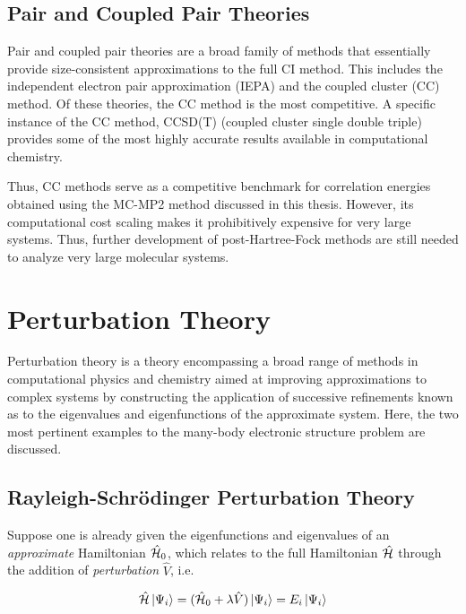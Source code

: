 \subsection{Pair and Coupled Pair Theories}

Pair and coupled pair theories are a broad family of methods that essentially
provide size-consistent approximations to the full CI method. This includes the
independent electron pair approximation (IEPA) and the coupled cluster (CC)
method. Of these theories, the CC method is the most competitive. A specific
instance of the CC method, CCSD(T) (coupled cluster single double triple)
provides some of the most highly accurate results available in computational
chemistry. \cite{cc1, cc2, cc3, cc4}

Thus, CC methods serve as a competitive benchmark for correlation energies
obtained using the MC-MP2 method discussed in this thesis. However, its
computational cost scaling makes it prohibitively expensive for very large
systems. Thus, further development of post-Hartree-Fock methods are still needed
to analyze very large molecular systems.

\section{Perturbation Theory}
\label{s:pt}

Perturbation theory is a theory encompassing a broad range of methods in
computational physics and chemistry aimed at improving approximations to complex
systems by constructing the application of successive refinements known as to
the eigenvalues and eigenfunctions of the approximate system. Here, the two most
pertinent examples to the many-body electronic structure problem are discussed.

\subsection{Rayleigh-Schr{\"o}dinger Perturbation Theory}

Suppose one is already given the eigenfunctions and eigenvalues of an
\emph{approximate} Hamiltonian $\hat{\mathcal{H}}_0$, which relates to the full Hamiltonian
$\hat{\mathcal{H}}$ through the addition of \emph{perturbation} $\hat V$, i.e.

\begin{equation}
	\hat{\mathcal{H}}\ket{\Psi_i} = (\hat{\mathcal{H}}_0 + \lambda\hat V) \ket{\Psi_i} = E_i \ket{\Psi_i}
	\label{eq:pt}
\end{equation}

